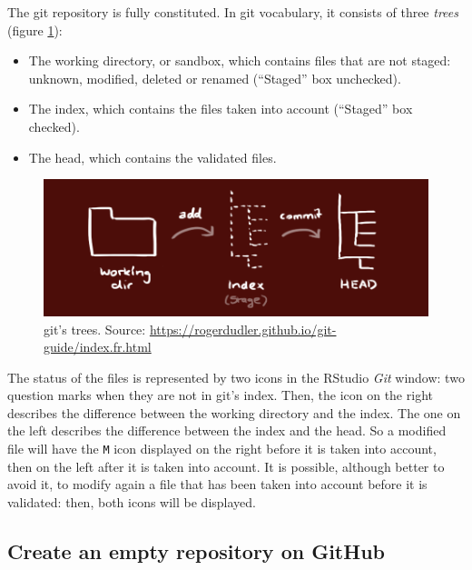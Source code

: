 \documentclass[
  12pt,
  american,
  a4paper,
  extrafontsizes,onecolumn,openright
  ]{memoir}
\providecommand{\tightlist}{%
  \setlength{\itemsep}{0pt}\setlength{\parskip}{0pt}}
\begin{document}
The git repository is fully constituted.
In git vocabulary, it consists of three \emph{trees} (figure \ref{fig:git-Trees}):

\begin{itemize}
\tightlist
\item
  The working directory, or sandbox, which contains files that are not staged: unknown, modified, deleted or renamed (\enquote{Staged} box unchecked).
\item
  The index, which contains the files taken into account (\enquote{Staged} box checked).
\item
  The head, which contains the validated files.
\end{itemize}



\scriptsize

\begin{figure}

{\centering \includegraphics[width=0.8\linewidth]{images/git-Trees} 

}

\caption{git's trees. Source: \url{https://rogerdudler.github.io/git-guide/index.fr.html}}\label{fig:git-Trees}
\end{figure}

\normalsize

The status of the files is represented by two icons in the RStudio \emph{Git} window: two question marks when they are not in git's index.
Then, the icon on the right describes the difference between the working directory and the index.
The one on the left describes the difference between the index and the head.
So a modified file will have the \texttt{M} icon displayed on the right before it is taken into account, then on the left after it is taken into account.
It is possible, although better to avoid it, to modify again a file that has been taken into account before it is validated: then, both icons will be displayed.

\hypertarget{create-an-empty-repository-on-github}{%
\subsection{Create an empty repository on GitHub}\label{create-an-empty-repository-on-github}}
\end{document}
